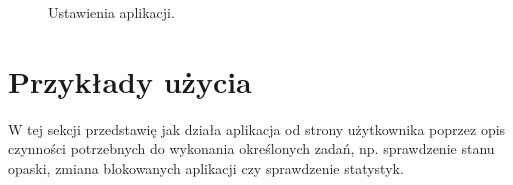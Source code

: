 \begin{figure}[H]
    \begin{center}
        \setlength{\fboxsep}{0pt}%
        \setlength{\fboxrule}{0.3pt}%
    \end{center}
    \caption{{\color{dgray}Ustawienia aplikacji.}} \label{Settings}
\end{figure}

\section{Przykłady użycia}
W tej sekcji przedstawię jak działa aplikacja od strony użytkownika poprzez opis czynności potrzebnych do wykonania określonych zadań, np. sprawdzenie stanu opaski, zmiana blokowanych aplikacji czy sprawdzenie statystyk.
